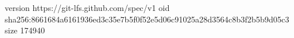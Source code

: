 version https://git-lfs.github.com/spec/v1
oid sha256:8661684a6161936ed3c35e7b5f0f52e5d06c91025a28d3564c8b3f2b5b9d05c3
size 174940
